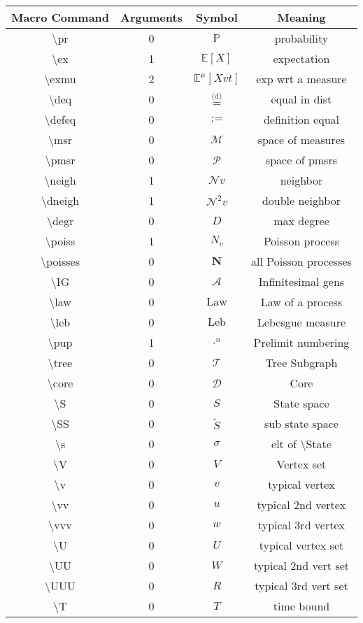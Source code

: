 \documentclass[12pt]{article}
\newcommand{\mb}{\mathbb}
\newcommand{\mc}{\mathcal}
\newcommand{\te}{\text}
\newcommand{\tbs}{\textbackslash}
\newcommand{\pr}{\mb{P}}							%
\newcommand{\ex}[1]{\mb{E}\left[#1\right]}			%
\newcommand{\exmu}[2]{\mb{E}^{#1}\left[#2\right]}	%
\newcommand{\deq}{\overset{\text{(d)}}{=}}			%
\newcommand{\defeq}{:=}								%
\newcommand{\msr}{\mc{M}}							%
\newcommand{\pmsr}{\mc{P}}							%
\renewcommand{\v}{v}							%
\newcommand{\vv}{u}								%
\newcommand{\vvv}{w}							%
\renewcommand{\U}{U}							%
\newcommand{\UU}{W}								%
\newcommand{\UUU}{R}							%
\renewcommand{\S}{S}							%
\newcommand{\s}{\sigma}							%
\newcommand{\T}{T}								%
\renewcommand{\t}{t}							%
\newcommand{\X}{X}								%
\newcommand{\IG}{\mc{A}}						%
\newcommand{\neigh}{\mc{N}}						%
\newcommand{\dneigh}{\mc{N}^2}					%
\newcommand{\degr}{D}							%
\newcommand{\tree}{\mc{T}}						%
\newcommand{\sln}[1]{^{#1}}						%
\newcommand{\poiss}[1]{N_{#1}}						%
\newcommand{\poisses}{\mathbf{N}}				%
\newcommand{\law}{\te{Law}}							%
\newcommand{\leb}{\te{Leb}}							%
\newcommand{\core}{\mc{D}}							%
\renewcommand{\SS}{\tilde{\S}}						%
\newcommand{\m}[3]{\mu_{#2#1}^{#3}}						%
\begin{document}
\begin{longtable}{c|c|c|c}
Macro Command & Arguments & Symbol & Meaning\\\hline
\tbs pr&0&\(\pr\)	& probability\\
\tbs ex&1&\(\ex{X}\)	&expectation\\
\tbs exmu&2&\(\exmu{\m{}{}{}}{\X{\v}{\t}}\)	&exp wrt a measure\\
\tbs deq&0&\(\deq\)		&equal in dist\\
\tbs defeq&0&\(\defeq\)							&definition equal\\
\tbs msr&0&\(\msr\)							&space of measures\\
\tbs pmsr&0&\(\pmsr\)						&space of pmsrs\\
\tbs neigh&1&\(\neigh{\v}\)				&neighbor\\
\tbs dneigh&1&\(\dneigh{\v}\)				&double neighbor\\
\tbs degr&0&\(\degr\)								&max degree\\
\tbs poiss&1&\(\poiss{\v}\)						&Poisson process\\
\tbs poisses&0&\(\poisses\)					&all Poisson processes\\
\tbs IG&0&\(\IG\)					&Infinitesimal gens\\
\tbs law&0&\(\law\)							&Law of a process\\
\tbs leb&0&\(\leb\)							&Lebesgue measure\\
\tbs pup&1&\(\cdot\sln{n}\)						&Prelimit numbering\\
\tbs tree&0&\(\tree\)							&Tree Subgraph\\
\tbs core&0&\(\core\)							&Core\\
\tbs S&0&\(\S\)							&State space\\
\tbs SS&0&\(\SS\)						&sub state space\\
\tbs s&0&\(\s\)								&elt of \tbs State\\
\tbs V&0&\( V\)									&Vertex set\\
\tbs v&0&\(\v\)								&typical vertex\\
\tbs vv&0&\(\vv\)									&typical 2nd vertex\\
\tbs vvv&0&\(\vvv\)								&typical 3rd vertex\\
\tbs U&0&\(\U\)									&typical vertex set\\
\tbs UU&0&\(\UU\)								&typical 2nd vert set\\
\tbs UUU&0&\(\UUU\)								&typical 3rd vert set\\
\tbs T&0&\(\T\)									&time bound\\

\end{longtable}
\end{document}
